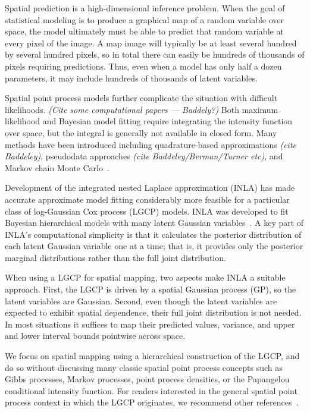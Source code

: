 \documentclass[]{interact}
\begin{document}

Spatial prediction is a high-dimensional inference problem. When the goal of
statistical modeling is to produce a graphical map of a random variable over
space, the model ultimately must be able to predict that random variable at
every pixel of the image. A map image will typically be at least several
hundred by several hundred pixels, so in total there can easily be hundreds of
thousands of pixels requiring predictions. Thus, even when a model has only
half a dozen parameters, it may include hundreds of thousands of latent
variables.

Spatial point process models further complicate the situation with difficult
likelihoods. {\it (Cite some computational papers --- Baddely?)} Both maximum
likelihood and Bayesian model fitting require integrating the intensity
function over space, but the integral is generally not available in closed
form. Many methods have been introduced including quadrature-based
approximations {\it (cite Baddeley)}, pseudodata approaches
{\it (cite Baddeley/Berman/Turner etc)}, and Markov chain Monte
Carlo~\cite{moellerwaagepetersen}.

Development of the integrated nested Laplace approximation (INLA) has made
accurate approximate model fitting considerably more feasible for a particular
class of log-Gaussian Cox process (LGCP) models. INLA was developed to fit
Bayesian hierarchical models with many latent Gaussian
variables~\cite{rueetal}. A key part of INLA's computational simplicity is that
it calculates the posterior distribution of each latent Gaussian variable one
at a time; that is, it provides only the posterior marginal distributions
rather than the full joint distribution.

When using a LGCP for spatial mapping, two aspects make INLA a suitable
approach. First, the LGCP is driven by a spatial Gaussian process (GP), so the
latent variables are Gaussian. Second, even though the latent variables are
expected to exhibit spatial dependence, their full joint distribution is not
needed. In most situations it suffices to map their predicted values, variance,
and upper and lower interval bounds pointwise across space.

We focus on spatial mapping using a hierarchical construction of the LGCP, and
do so without discussing many classic spatial point process concepts such as
Gibbs processes, Markov processes, point process densities, or the Papangelou
conditional intensity function. For readers interested in the general spatial
point process context in which the LGCP originates, we recommend other
references~\cite{moellerwaagepetersen, digglepoint, cressie}.
\end{document}
